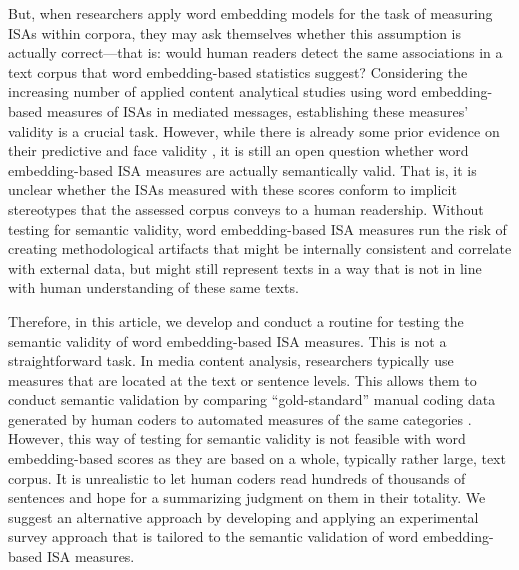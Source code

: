 But, when researchers apply word embedding models for the task of measuring ISAs within corpora, they may ask themselves whether this assumption is actually correct---that is: would human readers detect the same associations in a text corpus that word embedding-based statistics suggest? Considering the increasing number of applied content analytical studies using word embedding-based measures of ISAs in mediated messages, establishing these measures' validity is a crucial task. However, while there is already some prior evidence on their predictive and face validity \parencite[for a summary, see,][]{durrheim2023}, it is still an open question whether word embedding-based ISA measures are actually semantically valid. That is, it is unclear whether the ISAs measured with these scores conform to implicit stereotypes that the assessed corpus conveys to a human readership. Without testing for semantic validity, word embedding-based ISA measures run the risk of creating methodological artifacts that might be internally consistent and correlate with external data, but might still represent texts in a way that is not in line with human understanding of these same texts.

Therefore, in this article, we develop and conduct a routine for testing the semantic validity of word embedding-based ISA measures. This is not a straightforward task. In media content analysis, researchers typically use measures that are located at the text or sentence levels. This allows them to conduct semantic validation by comparing ``gold-standard'' manual coding data generated by human coders to automated measures of the same categories \parencite{Grimmer2013,song:2020:ivw}. However, this way of testing for semantic validity is not feasible with word embedding-based scores as they are based on a whole, typically rather large, text corpus. It is unrealistic to let human coders read hundreds of thousands of sentences and hope for a summarizing judgment on them in their totality. We suggest an alternative approach by developing and applying an experimental survey approach that is tailored to the semantic validation of word embedding-based ISA measures. 


